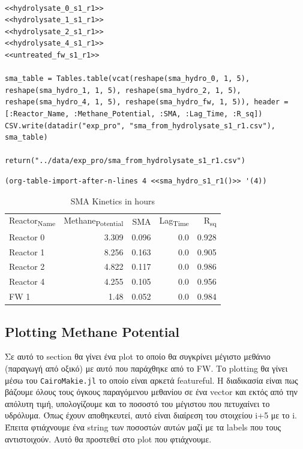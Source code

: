 \documentclass[11pt]{article}
\begin{document}
\begin{verbatim}

<<hydrolysate_0_s1_r1>>
<<hydrolysate_1_s1_r1>>
<<hydrolysate_2_s1_r1>>
<<hydrolysate_4_s1_r1>>
<<untreated_fw_s1_r1>>

sma_table = Tables.table(vcat(reshape(sma_hydro_0, 1, 5), reshape(sma_hydro_1, 1, 5), reshape(sma_hydro_2, 1, 5), reshape(sma_hydro_4, 1, 5), reshape(sma_hydro_fw, 1, 5)), header = [:Reactor_Name, :Methane_Potential, :SMA, :Lag_Time, :R_sq])
CSV.write(datadir("exp_pro", "sma_from_hydrolysate_s1_r1.csv"), sma_table)

return("../data/exp_pro/sma_from_hydrolysate_s1_r1.csv")
\end{verbatim}

\begin{verbatim}
(org-table-import-after-n-lines 4 <<sma_hydro_s1_r1()>> '(4))
\end{verbatim}

\begin{table}[htbp]
\caption{SMA Kinetics in hours}
\centering
\begin{tabular}{lrrrr}
Reactor\textsubscript{Name} & Methane\textsubscript{Potential} & SMA & Lag\textsubscript{Time} & R\textsubscript{sq}\\[0pt]
Reactor 0 & 3.309 & 0.096 & 0.0 & 0.928\\[0pt]
Reactor 1 & 8.256 & 0.163 & 0.0 & 0.905\\[0pt]
Reactor 2 & 4.822 & 0.117 & 0.0 & 0.986\\[0pt]
Reactor 4 & 4.255 & 0.105 & 0.0 & 0.956\\[0pt]
FW 1 & 1.48 & 0.052 & 0.0 & 0.984\\[0pt]
\end{tabular}
\end{table}

\subsection{Plotting Methane Potential}
\label{sec:orgb822694}
Σε αυτό το section θα γίνει ένα plot το οποίο θα συγκρίνει μέγιστο μεθάνιο (παραγωγή από οξικό) με αυτό που παράχθηκε από το FW. Το plotting θα γίνει μέσω του \texttt{CairoMakie.jl} το οποίο είναι αρκετά featureful. Η διαδικασία είναι πως βάζουμε όλους τους όγκους παραγόμενου μεθανίου σε ένα vector και εκτός από την απόλυτη τιμή, υπολογίζουμε και το ποσοστό του μέγιστου που πετυχαίνει το υδρόλυμα. Όπως έχουν αποθηκευτεί, αυτό είναι διαίρεση του στοιχείου i+5 με το i. Έπειτα φτιάχνουμε ένα string των ποσοστών αυτών μαζί με τα labels που τους αντιστοιχούν. Αυτό θα προστεθεί στο plot που φτιάχνουμε.
\end{document}
